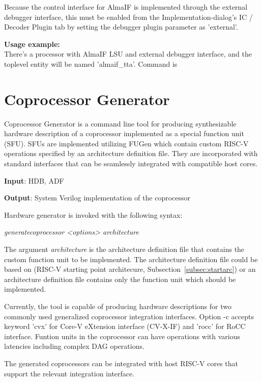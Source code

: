 \documentclass[a4paper,twoside]{tceusermanual}
\begin{document}
Because the control interface for AlmaIF is implemented through the external
debugger interface, this must be enabled from the Implementation-dialog's
IC / Decoder Plugin tab by setting the debugger plugin parameter as 'external'.

\textbf{Usage example:} \\
There's a processor with AlmaIF LSU and external debugger interface, and the
toplevel entity will be named 'almaif\_tta'. Command is



\section{Coprocessor Generator}
\label{sec:gencopro}
Coprocessor Generator is a command line tool for producing synthesizable hardware 
description of a coprocessor implemented as a special function unit (SFU). SFUs are 
implemented utilizing FUGen which contain custom RISC-V operations specified by 
an architecture definition file. They are incorporated with standard interfaces 
that can be seamlessly integrated with compatible host cores.

\textbf{Input}: HDB, ADF

\textbf{Output}: System Verilog implementation of the coprocessor

Hardware generator is invoked with the following syntax:

\textit{generatecoprocessor <options> architecture}

The argument \textit{architecture} is the architecture definition file that 
contains the custom function unit to be implemented. The architecture 
definition file could be based on  (RISC-V starting point 
architecure, Subsection~\ref{subsec:startarc}) or an architecture definition 
file contains only the function unit which should be implemented.

Currently, the tool is capable of producing hardware descriptions for 
two commonly used generalized coprocessor integration interfaces. Option -c 
accepts keyword 'cvx' for Core-V eXtension interface (CV-X-IF) and 
'rocc' for RoCC interface. Funtion units in the coprocessor can have operations with various 
latencies including complex DAG operations.

The generated coprocessors can be integrated with host RISC-V cores that support the 
relevant integration interface.
\end{document}
